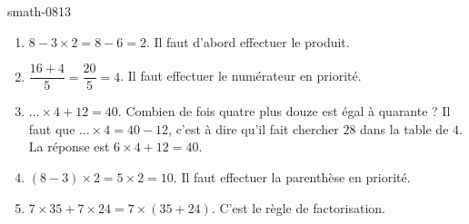 
\begin{corrige}{smath-0813}

    \begin{enumerate}
        \item
            \( 8-3\times 2=8-6=2\). Il faut d'abord effectuer le produit.
        \item
            \( \dfrac{ 16+4 }{ 5 }= \dfrac{ 20 }{ 5 }=4 \). Il faut effectuer le numérateur en priorité.
        \item
            \( \ldots \times 4+12=40\). Combien de fois quatre plus douze est égal à quarante ? Il faut que \( \ldots\times 4=40-12\), c'est à dire qu'il fait chercher \( 28\) dans la table de \( 4\). La réponse est \( 6\times 4+12=40\).
        \item
            \( (8-3)\times 2= 5\times 2=10\). Il faut effectuer la parenthèse en priorité.
        \item
            \( 7\times 35+7\times 24=7\times(35 +24)\). C'est le règle de factorisation.
    \end{enumerate}


\end{corrige}
